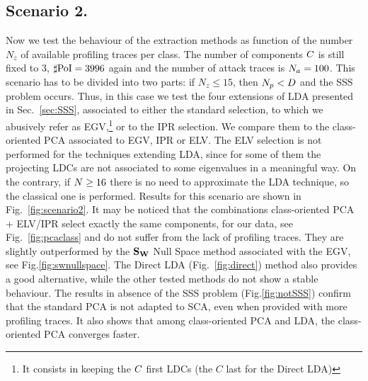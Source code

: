 \subsection{Scenario 2.}

Now we test the behaviour of the extraction methods as function of the number $N_z$ of available profiling traces per class. The number of components $C$ is still fixed to 3, $\sharp\mathrm{PoI}=3996$ again and the number of attack traces is $N_a=100$. This scenario has to be divided into two parts: if $N_z\leq 15$, then $N_p<D$ and the SSS problem occurs. Thus, in this case we test the four extensions of LDA presented in Sec.~\ref{sec:SSS}, associated to either the standard selection, to which we abusively refer as EGV,\footnote{It consists in keeping the $C$ first LDCs (the $C$ last for the Direct LDA)}
or to the IPR selection.  We compare them to the class-oriented PCA associated to EGV, IPR or ELV. The ELV selection is not performed for the techniques extending LDA, since for some of them the projecting LDCs are not associated to some eigenvalues in a meaningful way. On the contrary, if $N \geq 16$ there is no need to approximate the LDA technique, so the classical one is performed. Results for this scenario are shown in Fig.~\ref{fig:scenario2}. It may be noticed that the combinations class-oriented PCA + ELV/IPR select exactly the same components, for our data, see Fig.~\ref{fig:pcaclass} and do not suffer from the lack of profiling traces. They are slightly outperformed by the $\textbf{S}_{\textbf{W}}$ Null Space method associated with the EGV, see Fig.\ref{fig:swnullspace}. The Direct LDA (Fig.~\ref{fig:direct}) method also provides a good alternative, while the other tested methods do not show a stable behaviour. The results in absence of the SSS problem (Fig.\ref{fig:notSSS}) confirm that the standard PCA is not adapted to SCA, even when provided with more profiling traces. It also shows that among class-oriented PCA and LDA, the class-oriented PCA converges faster.



